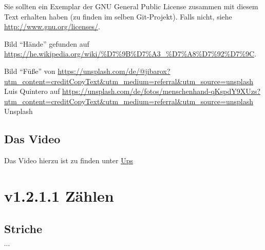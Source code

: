 \documentclass[a4paper]{amsart}
\theoremstyle{definition}
\begin{document}
Sie sollten ein Exemplar der GNU General Public License zusammen mit diesem Text erhalten haben
(zu finden im selben Git-Projekt).
Falls nicht, siehe \url{http://www.gnu.org/licenses/}.

Bild "`Hände"' gefunden auf \url{https://he.wikipedia.org/wiki/%D7%9B%D7%A3_%D7%A8%D7%92%D7%9C}.

Bild "`Füße"' von \url{https://unsplash.com/de/@jibarox?utm_content=creditCopyText\&utm_medium=referral\&utm_source=unsplash} Luis Quintero auf \url{https://unsplash.com/de/fotos/menschenhand-qKspdY9XUzs?utm\_content=creditCopyText\&utm_medium=referral\&utm\_source=unsplash} Unsplash

\subsection*{Das Video}
Das Video hierzu ist zu finden unter \url{Ups}

\section{v1.2.1.1 Zählen}
\def\kategoryVspace{5pt}

\subsection{Striche}
$\cdots$
\end{document}
